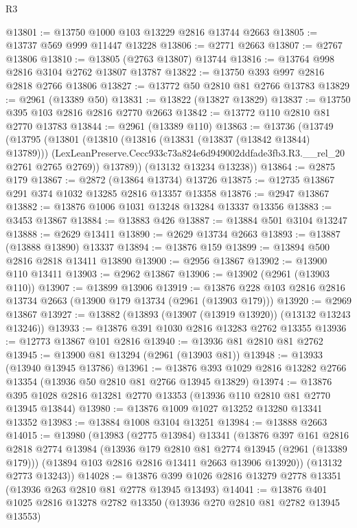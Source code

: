 \begin{lexlean}{R3}
\begin{coremodule}
@13801 := @13750 @1000 @103 @13229 @2816 @13744 @2663
@13805 := @13737 @569 @999 @11447 @13228
@13806 := @2771 @2663
@13807 := @2767 @13806
@13810 := @13805 (@2763 @13807) @13744
@13816 := @13764 @998 @2816 @3104 @2762 @13807 @13787
@13822 := @13750 @393 @997 @2816 @2818 @2766 @13806
@13827 := @13772 @50 @2810 @81 @2766 @13783
@13829 := @2961 (@13389 @50)
@13831 := @13822 (@13827 @13829)
@13837 := @13750 @395 @103 @2816 @2816 @2770 @2663
@13842 := @13772 @110 @2810 @81 @2770 @13783
@13844 := @2961 (@13389 @110)
@13863 := @13736
    (@13749
      (@13795
        (@13801
          (@13810
            (@13816 (@13831 (@13837 (@13842 @13844) @13789)))
            (LexLeanPreserve.Cecc933c73a824e6d949002ddfade3fb3.R3.__rel_20 @2761 @2765 @2769))
          @13789))
      (@13132 @13234 @13238))
@13864 := @2875 @179
@13867 := @2872 (@13864 @13734) @13726
@13875 := @12735 @13867 @291 @374 @1032 @13285 @2816 @13357 @13358
@13876 := @2947 @13867
@13882 := @13876 @1006 @1031 @13248 @13284 @13337 @13356
@13883 := @3453 @13867
@13884 := @13883 @426
@13887 := @13884 @501 @3104 @13247
@13888 := @2629 @13411
@13890 := @2629 @13734 @2663
@13893 := @13887 (@13888 @13890) @13337
@13894 := @13876 @159
@13899 := @13894 @500 @2816 @2818 @13411 @13890
@13900 := @2956 @13867
@13902 := @13900 @110 @13411
@13903 := @2962 @13867
@13906 := @13902 (@2961 (@13903 @110))
@13907 := @13899 @13906
@13919 := @13876 @228 @103 @2816 @2816 @13734 @2663 (@13900 @179 @13734 (@2961 (@13903 @179)))
@13920 := @2969 @13867
@13927 := @13882 (@13893 (@13907 (@13919 @13920)) (@13132 @13243 @13246))
@13933 := @13876 @391 @1030 @2816 @13283 @2762 @13355
@13936 := @12773 @13867 @101 @2816
@13940 := @13936 @81 @2810 @81 @2762
@13945 := @13900 @81 @13294 (@2961 (@13903 @81))
@13948 := @13933 (@13940 @13945 @13786)
@13961 := @13876 @393 @1029 @2816 @13282 @2766 @13354 (@13936 @50 @2810 @81 @2766 @13945 @13829)
@13974 := @13876 @395 @1028 @2816 @13281 @2770 @13353 (@13936 @110 @2810 @81 @2770 @13945 @13844)
@13980 := @13876 @1009 @1027 @13252 @13280 @13341 @13352
@13983 := @13884 @1008 @3104 @13251
@13984 := @13888 @2663
@14015 := @13980
    (@13983
      (@2775 @13984)
      @13341
      (@13876
        @397
        @161
        @2816
        @2818
        @2774
        @13984
        (@13936 @179 @2810 @81 @2774 @13945 (@2961 (@13389 @179)))
        (@13894 @103 @2816 @2816 @13411 @2663 @13906 @13920))
      (@13132 @2773 @13243))
@14028 := @13876 @399 @1026 @2816 @13279 @2778 @13351 (@13936 @263 @2810 @81 @2778 @13945 @13493)
@14041 := @13876 @401 @1025 @2816 @13278 @2782 @13350 (@13936 @270 @2810 @81 @2782 @13945 @13553)

\end{coremodule}
\end{lexlean}
